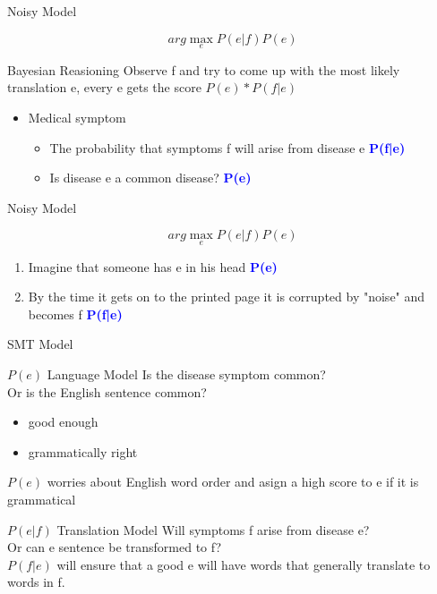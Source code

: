 \documentclass{beamer}
\begin{document}
\begin{frame}{Noisy Model}
    \begin{displaybox}{5cm}     %
    \[ arg\max_{e}{P(e|f)P(e)} \] 
     \end{displaybox} 
    
    \begin{block}{Bayesian Reasioning}
        Observe f and try to come up with the most likely translation e, every e gets the score $P(e)*P(f|e)$
        \begin{itemize}
            \item Medical symptom
                \begin{itemize}
                    \item The probability that symptoms f will arise from disease e \textcolor{blue}{\textbf{P(f|e)}}
                    \item Is disease e a common disease? \textcolor{blue}{\textbf{P(e)}}
                \end{itemize}
        \end{itemize}
    \end{block}
\end{frame}

\begin{frame}{Noisy Model}
    \begin{displaybox}{5cm}     %
    \[ arg\max_{e}{P(e|f)P(e)} \] 
     \end{displaybox} 
    \begin{enumerate}
    \item Imagine that someone has e in his head \textcolor{blue}{\textbf{P(e)}} 
    \item By the time it gets on to the printed page it is corrupted by "noise" and becomes f \textcolor{blue}{\textbf{P(f|e)}}
    \end{enumerate}
\end{frame}

\begin{frame}{SMT Model}
    \begin{block}{$P(e)$ Language Model}
        Is the disease symptom common?\\
        Or is the English sentence common?
        \begin{itemize}
            \item good enough
            \item grammatically right
        \end{itemize}
        $P(e)$ worries about English word order and asign a high score to e if it is grammatical
    \end{block}
    \begin{block}{$P(e|f)$ Translation Model}
        Will symptoms f arise from disease e?\\
        Or can e sentence be transformed to f?\\
        $P(f|e)$ will ensure that a good e will have words that generally translate to words in f.
    \end{block}
\end{frame}
\end{document}
